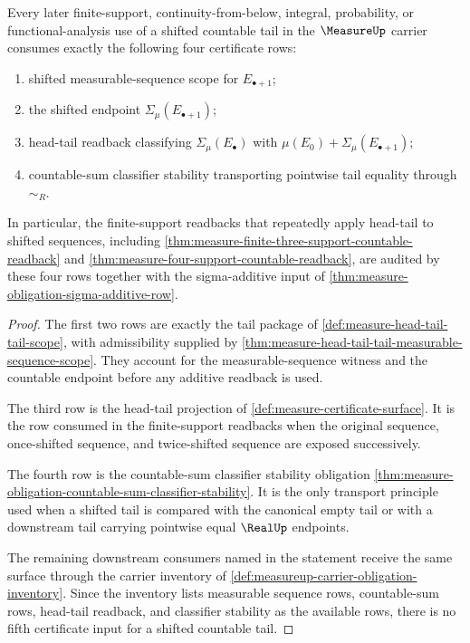 \begin{theorem}
\label{thm:measure-head-tail-consumer-exhaustion}
Every later finite-support, continuity-from-below, integral, probability, or
functional-analysis use of a shifted countable tail in the $\MeasureUp$ carrier
consumes exactly the following four certificate rows:
\begin{enumerate}
  \item shifted measurable-sequence scope for $E_{\bullet+1}$;
  \item the shifted endpoint $\Sigma_\mu(E_{\bullet+1})$;
  \item head-tail readback classifying $\Sigma_\mu(E_\bullet)$ with
  $\mu(E_0)+\Sigma_\mu(E_{\bullet+1})$;
  \item countable-sum classifier stability transporting pointwise tail
  equality through $\sim_R$.
\end{enumerate}
In particular, the finite-support readbacks that repeatedly apply head-tail to
shifted sequences, including
\autoref{thm:measure-finite-three-support-countable-readback} and
\autoref{thm:measure-four-support-countable-readback}, are audited by these
four rows together with the sigma-additive input of
\autoref{thm:measure-obligation-sigma-additive-row}.
\end{theorem}
\begin{proof}
The first two rows are exactly the tail package of
\autoref{def:measure-head-tail-tail-scope}, with admissibility supplied by
\autoref{thm:measure-head-tail-tail-measurable-sequence-scope}. They account for
the measurable-sequence witness and the countable endpoint before any additive
readback is used.

The third row is the head-tail projection of
\autoref{def:measure-certificate-surface}. It is the row consumed in the
finite-support readbacks when the original sequence, once-shifted sequence, and
twice-shifted sequence are exposed successively.

The fourth row is the countable-sum classifier stability obligation
\autoref{thm:measure-obligation-countable-sum-classifier-stability}. It is the
only transport principle used when a shifted tail is compared with the canonical
empty tail or with a downstream tail carrying pointwise equal $\RealUp$
endpoints.

The remaining downstream consumers named in the statement receive the same
surface through the carrier inventory of
\autoref{def:measureup-carrier-obligation-inventory}. Since the inventory lists
measurable sequence rows, countable-sum rows, head-tail readback, and classifier
stability as the available rows, there is no fifth certificate input for a
shifted countable tail.
\end{proof}

